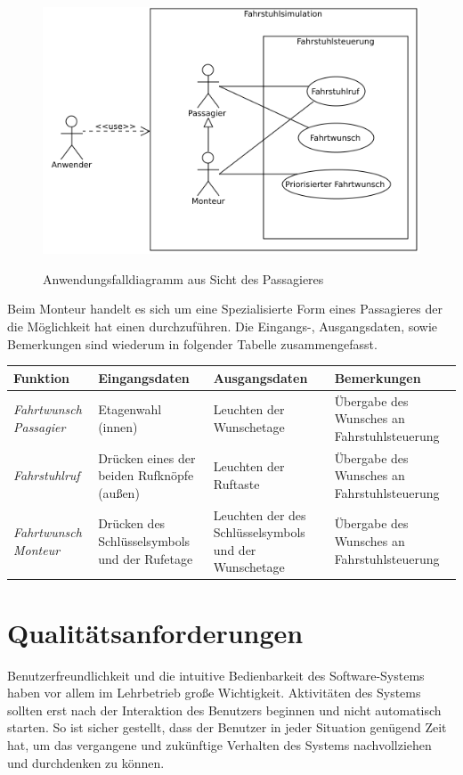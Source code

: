 \begin{figure}[hbt]
	\includegraphics{images/passagierAWF.png}
	\label{fig:passagierAWF}
	\caption{Anwendungsfalldiagramm aus Sicht des Passagieres}
\end{figure}
Beim Monteur handelt es sich um eine Spezialisierte Form eines Passagieres der die Möglichkeit hat einen  durchzuführen.
Die Eingangs-, Ausgangsdaten, sowie Bemerkungen sind wiederum in folgender Tabelle zusammengefasst.

 {
\vspace{1cm}
\hspace{-0,5cm}
\footnotesize
\begin{tabular}{|p{2cm}|p{3cm}|p{3cm}|p{3cm}|}
	\hline
		\textbf{Funktion} &
		\textbf{Eingangsdaten} &
		\textbf{Ausgangsdaten} &
		\textbf{Bemerkungen} \\
	\hline \hline
		\textit{Fahrtwunsch \newline Passagier} &
		Etagenwahl (innen) &
		Leuchten der Wunschetage &
		Übergabe des Wunsches an Fahrstuhlsteuerung \\
	\hline
		\textit{Fahrstuhlruf} &
		Drücken eines der beiden Rufknöpfe (außen) &
		Leuchten der Ruftaste &
		Übergabe des Wunsches an Fahrstuhlsteuerung  \\
	\hline
		\textit{Fahrtwunsch \newline Monteur} &
		Drücken des Schlüsselsymbols und der Rufetage &
		Leuchten der des Schlüsselsymbols und der Wunschetage &
		Übergabe des Wunsches an Fahrstuhlsteuerung  \\
	\hline
\end{tabular}
}

\section{Qualitätsanforderungen}
Benutzerfreundlichkeit und die intuitive Bedienbarkeit des Software-Systems haben vor allem im Lehrbetrieb große Wichtigkeit. Aktivitäten des Systems sollten erst nach der Interaktion des Benutzers beginnen und nicht automatisch starten. So ist sicher gestellt, dass der Benutzer in jeder Situation genügend Zeit hat, um das vergangene und zukünftige Verhalten des Systems nachvollziehen und durchdenken zu können. 

